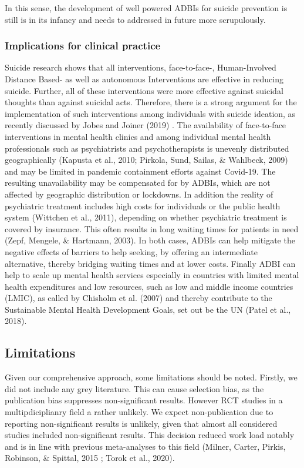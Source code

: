 \documentclass[
  english,
  man]{apa6}
\begin{document}
In this sense, the development of well powered ADBIs for suicide prevention is still is in its infancy and needs to addressed in future more scrupulously.

\hypertarget{implications-for-clinical-practice}{%
\subsubsection{Implications for clinical practice}\label{implications-for-clinical-practice}}

Suicide research shows that all interventions, face-to-face-, Human-Involved Distance Based- as well as autonomous Interventions are effective in reducing suicide. Further, all of these interventions were more effective against suicidal thoughts than against suicidal acts. Therefore, there is a strong argument for the implementation of such interventions among individuals with suicide ideation, as recently discussed by Jobes and Joiner (2019) . The availability of face-to-face interventions in mental health clinics and among individual mental health professionals such as psychiatrists and psychotherapists is unevenly distributed geographically (Kapusta et al., 2010; Pirkola, Sund, Sailas, \& Wahlbeck, 2009) and may be limited in pandemic containment efforts against Covid-19. The resulting unavailability may be compensated for by ADBIs, which are not affected by geographic distribution or lockdowns. In addition the reality of psychiatric treatment includes high costs for individuals or the public health system (Wittchen et al., 2011), depending on whether psychiatric treatment is covered by insurance. This often results in long waiting times for patients in need (Zepf, Mengele, \& Hartmann, 2003). In both cases, ADBIs can help mitigate the negative effects of barriers to help seeking, by offering an intermediate alternative, thereby bridging waiting times and at lower costs. Finally ADBI can help to scale up mental health services especially in countries with limited mental health expenditures and low resources, such as low and middle income countries (LMIC), as called by Chisholm et al. (2007) and thereby contribute to the Sustainable Mental Health Development Goals, set out be the UN (Patel et al., 2018).

\hypertarget{limitations}{%
\subsection{Limitations}\label{limitations}}

Given our comprehensive approach, some limitations should be noted. Firstly, we did not include any grey literature. This can cause selection bias, as the publication bias suppresses non-significant results. However RCT studies in a multipdiciplianry field a rather unlikely. We expect non-publication due to reporting non-significant results is unlikely, given that almost all considered studies included non-significant results. This decision reduced work load notably and is in line with previous meta-analyses to this field (Milner, Carter, Pirkis, Robinson, \& Spittal, 2015 ; Torok et al., 2020).
\end{document}
